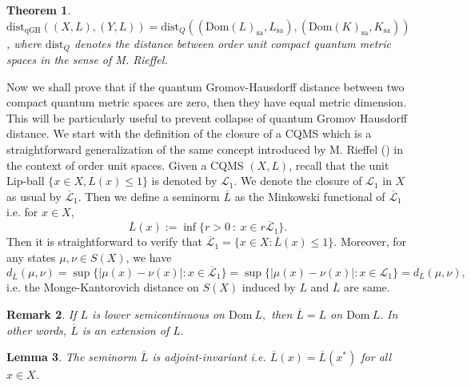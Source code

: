 \documentclass[a4paper,11pt,reqno]{amsart}
\theoremstyle{plain}
\newtheorem{thm}{Theorem}[section]
\newtheorem{lem}[thm]{Lemma}
\newtheorem{rem}[thm]{Remark}
\theoremstyle{mainthmstyle}
\theoremstyle{named}
\numberwithin{equation}{section}
\begin{document}
\begin{thm} \label{Rieffelequality}
   $\mathrm{dist}_{\mathrm {qGH}}((X,L),(Y,L))=\mathrm{dist}_{Q}((\mathrm{Dom}(L)_{\mathrm {sa}},L_{\mathrm{sa}}),(\mathrm{Dom}(K)_{\mathrm {sa}},K_{\mathrm {sa}}))$, where $\mathrm{dist}_{Q}$ denotes the distance between order unit compact quantum metric spaces in the sense of M. Rieffel. 
\end{thm}
Now we shall prove that if the quantum Gromov-Hausdorff distance between two compact quantum metric spaces are zero, then they have equal metric dimension. This will be particularly useful to prevent collapse of quantum Gromov Hausdorff distance. We start with the definition of the closure of a CQMS which is a straightforward generalization of the same concept introduced by M. Rieffel (\cite{Rieffel-Metric}) in the context of order unit spaces. Given a CQMS $(X,L)$, recall that the unit Lip-ball $\{x\in X, L(x)\leq 1\}$ is denoted by $\mathcal{L}_{1}$. We denote the closure of $\mathcal{L}_1$ in $X$ as usual by $\overline{\mathcal{L}}_1$. Then we define a seminorm $\overline{L}$ as the Minkowski functional of $\overline{\mathcal{L}}_1$ i.e. for $x\in X$,
\begin{displaymath}
    \overline{L}(x):=\inf\{r>0\ :\ x\in r\overline{\mathcal{L}}_1\}.
\end{displaymath}
Then it is straightforward to verify that $\overline{\mathcal{L}}_1=\{x\in X:\overline{L}(x)\leq 1\}$. Moreover, for any states $\mu,\nu\in S(X)$, we have
\begin{displaymath}
    d_{\overline{L}}(\mu,\nu)=\sup\{\lvert\mu(x)-\nu(x)\rvert:x\in\overline{\mathcal{L}}_1\}=\sup\{\lvert\mu(x)-\nu(x)\rvert:x\in\mathcal{L}_1\}=d_{L}(\mu,\nu),
\end{displaymath}
i.e. the Monge-Kantorovich distance on $S(X)$ induced by $L$ and $\overline{L}$ are same.

\begin{rem}
If $L$ is lower semicontinuous on $\mathrm {Dom}\ L,$ then $\overline {L} = L$ on $\mathrm {Dom}\ L.$ In other words, $\overline L$ is an extension of $L.$
\end{rem}


\begin{lem}
\label{Lip-Ext-Adj}
 The seminorm $\overline {L}$ is adjoint-invariant i.e. $\overline{L}(x)=\overline{L}(x^{\ast})$ for all $x\in X$. 
\end{lem}
\end{document}
